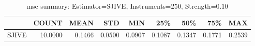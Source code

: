 \begin{table}[ht]
\centering
\caption{mse summary: Estimator=SJIVE, Instruments=250, Strength=0.10}
\begin{tabular}{lrrrrrrrr}
\toprule
 & COUNT & MEAN & STD & MIN & 25\% & 50\% & 75\% & MAX \\
\midrule
SJIVE & 10.0000 & 0.1466 & 0.0500 & 0.0907 & 0.1087 & 0.1347 & 0.1771 & 0.2539 \\
\bottomrule
\end{tabular}
\end{table}
